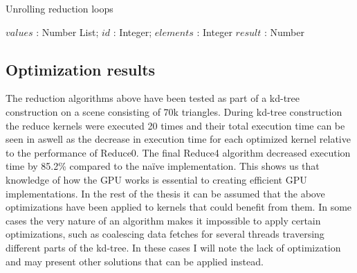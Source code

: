 \begin{algorithm}
  \caption{Unrolling reduction loops}
  \label{alg:unrollReduct}
  \begin{algorithmic}
              {$values$ : Number List; $id$ : Integer; $elements$ : Integer}
              {$result$ : Number}
              {
                \SYNC
                  \ENDIF
                  \SYNC
                \ENDWHILE
                \ENDIF
              }
  \end{algorithmic}
\end{algorithm}

\subsection{Optimization results}\label{sec:optimizationResults}

The reduction algorithms above have been tested as part of a kd-tree
construction on a scene consisting of 70k triangles. During kd-tree construction
the reduce kernels were executed 20 times and their total execution time can be
seen in  aswell as the decrease in execution
time for each optimized kernel relative to the performance of Reduce0. The final
Reduce4 algorithm decreased execution time by 85.2\% compared to the naïve
implementation. This shows us that knowledge of how the GPU works is essential
to creating efficient GPU implementations. In the rest of the thesis it can be
assumed that the above optimizations have been applied to kernels that could
benefit from them. In some cases the very nature of an algorithm makes it
impossible to apply certain optimizations, such as coalescing data fetches for
several threads traversing different parts of the kd-tree. In these cases I will
note the lack of optimization and may present other solutions that can be
applied instead.

